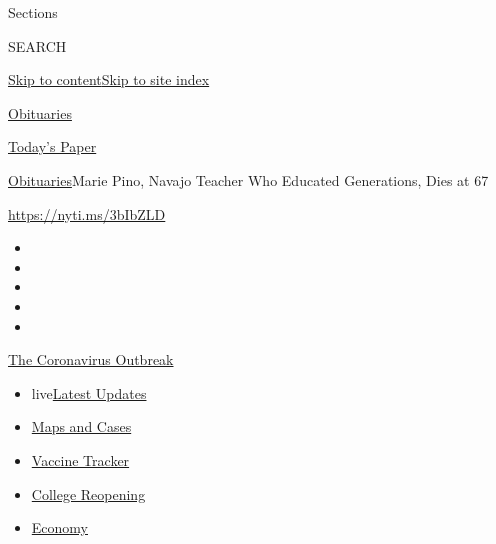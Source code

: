 Sections

SEARCH

\protect\hyperlink{site-content}{Skip to
content}\protect\hyperlink{site-index}{Skip to site index}

\href{https://www.nytimes.com/section/obituaries}{Obituaries}

\href{https://myaccount.nytimes.com/auth/login?response_type=cookie\&client_id=vi}{}

\href{https://www.nytimes.com/section/todayspaper}{Today's Paper}

\href{/section/obituaries}{Obituaries}\textbar{}Marie Pino, Navajo
Teacher Who Educated Generations, Dies at 67

\url{https://nyti.ms/3bIbZLD}

\begin{itemize}
\item
\item
\item
\item
\item
\end{itemize}

\href{https://www.nytimes.com/news-event/coronavirus?action=click\&pgtype=Article\&state=default\&region=TOP_BANNER\&context=storylines_menu}{The
Coronavirus Outbreak}

\begin{itemize}
\tightlist
\item
  live\href{https://www.nytimes.com/2020/08/03/world/coronavirus-covid-19.html?action=click\&pgtype=Article\&state=default\&region=TOP_BANNER\&context=storylines_menu}{Latest
  Updates}
\item
  \href{https://www.nytimes.com/interactive/2020/us/coronavirus-us-cases.html?action=click\&pgtype=Article\&state=default\&region=TOP_BANNER\&context=storylines_menu}{Maps
  and Cases}
\item
  \href{https://www.nytimes.com/interactive/2020/science/coronavirus-vaccine-tracker.html?action=click\&pgtype=Article\&state=default\&region=TOP_BANNER\&context=storylines_menu}{Vaccine
  Tracker}
\item
  \href{https://www.nytimes.com/2020/08/02/us/covid-college-reopening.html?action=click\&pgtype=Article\&state=default\&region=TOP_BANNER\&context=storylines_menu}{College
  Reopening}
\item
  \href{https://www.nytimes.com/live/2020/08/03/business/stock-market-today-coronavirus?action=click\&pgtype=Article\&state=default\&region=TOP_BANNER\&context=storylines_menu}{Economy}
\end{itemize}


